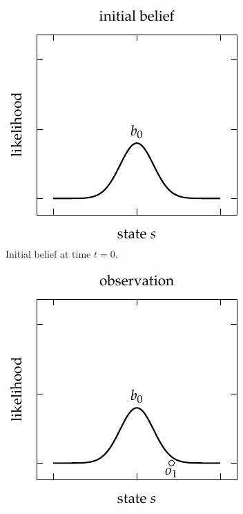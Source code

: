 \begin{figure}[t!]
    \centering
    \begin{subfigure}[t]{0.30\linewidth}
        \centering
        \includegraphics[width=\linewidth]{diagrams/introduction/belief1.pdf}
        \caption{Initial belief at time $t=0$.}
        \label{fig:belief1}
    \end{subfigure}
    \hfill
    \begin{subfigure}[t]{0.30\linewidth}
        \centering
        \includegraphics[width=\linewidth]{diagrams/introduction/belief2.pdf}

\end{subfigure}
\end{figure}
